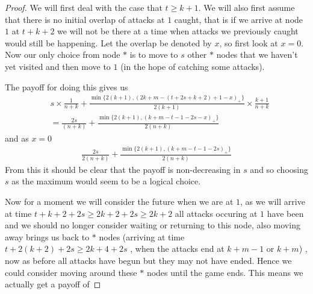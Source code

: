 \documentclass[a4paper,10pt]{article}
\newcommand{\pospart}[1]{\left( #1 \right)_{+}}
\theoremstyle{definition}
\theoremstyle{definition}
\theoremstyle{remark}
\theoremstyle{definition}
\begin{document}
\begin{proof}
We will first deal with the case that $t \geq k+1$. We will also first assume that there is no initial overlap of attacks at $1$ caught, that is if we arrive at node $1$ at $t+k+2$ we will not be there at a time when attacks we previously caught would still be happening.
Let the overlap be denoted by $x$, so first look at $x=0$. Now our only choice from node $*$ is to move to $s$ other $*$ nodes that we haven't yet visited and then move to $1$ (in the hope of catching some attacks).

The payoff for doing this gives us
\begin{align*}
&s \times \frac{1}{n+k} +\frac{\min \{ 2(k+1), \pospart{2k+m-(t+2s+k+2)+1-x} \}}{2(k+1)} \times \frac{k+1}{n+k} \\
&=\frac{2s}{(n+k)} +\frac{\min \{ 2(k+1), \pospart{k+m-t-1-2s-x} \}}{2(n+k)} 
\end{align*}
and as $x=0$
\begin{align*}
\frac{2s}{2(n+k)} +\frac{\min \{ 2(k+1), \pospart{k+m-t-1-2s} \}}{2(n+k)} 
\end{align*}
From this it should be clear that the payoff is non-decreasing in $s$ and so choosing $s$ as the maximum would seem to be a logical choice.

Now for a moment we will consider the future when we are at $1$, as we will arrive at time $t+k+2+2s \geq 2k+2+2s \geq 2k+2$ all attacks occuring at $1$ have been and we should no longer consider waiting or returning to this node, also moving away brings us back to $*$ nodes (arriving at time $t+2(k+2)+2s \geq 2k+4+2s$ , when the attacks end at $k+m-1$ or $k+m$) , now as before all attacks have begun but they may not have ended. Hence we could consider moving around these $*$ nodes until the game ends. This means we actually get a payoff of


\end{proof}
\end{document}

